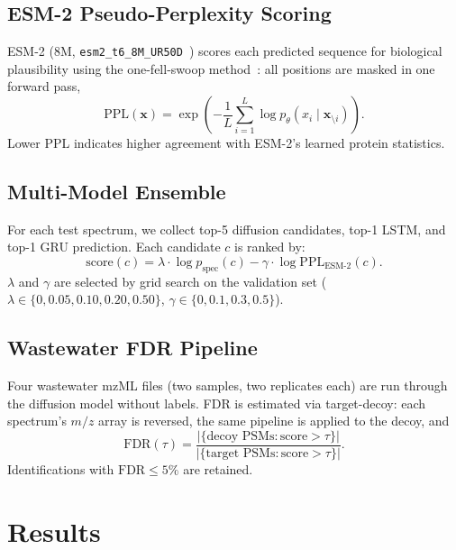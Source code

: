 \documentclass[11pt]{article}
\begin{document}
\subsection{ESM-2 Pseudo-Perplexity Scoring}

ESM-2 (8M, \texttt{esm2\_t6\_8M\_UR50D}~\cite{esm2}) scores each predicted
sequence for biological plausibility using the one-fell-swoop method~\cite{ofs}:
all positions are masked in one forward pass,
\begin{equation}
  \mathrm{PPL}(\mathbf{x}) = \exp\!\left(
  -\frac{1}{L}\sum_{i=1}^{L}\log p_\theta(x_i \mid \mathbf{x}_{\setminus i})
  \right).
\end{equation}
Lower PPL indicates higher agreement with ESM-2's learned protein statistics.

\subsection{Multi-Model Ensemble}

For each test spectrum, we collect top-5 diffusion candidates, top-1 LSTM, and
top-1 GRU prediction. Each candidate $c$ is ranked by:
\begin{equation}
  \mathrm{score}(c) = \lambda \cdot \log p_\text{spec}(c)
  - \gamma \cdot \log \mathrm{PPL}_\text{ESM-2}(c).
\end{equation}
$\lambda$ and $\gamma$ are selected by grid search on the validation set
($\lambda\in\{0,0.05,0.10,0.20,0.50\}$, $\gamma\in\{0,0.1,0.3,0.5\}$).

\subsection{Wastewater FDR Pipeline}

Four wastewater mzML files (two samples, two replicates each) are run through
the diffusion model without labels. FDR is estimated via target-decoy:
each spectrum's $m/z$ array is reversed, the same pipeline is applied to the
decoy, and
\begin{equation}
  \mathrm{FDR}(\tau) = \frac{|\{\text{decoy PSMs}: \mathrm{score}>\tau\}|}
  {|\{\text{target PSMs}: \mathrm{score}>\tau\}|}.
\end{equation}
Identifications with $\mathrm{FDR} \leq 5\%$ are retained.

\section{Results}
\end{document}
